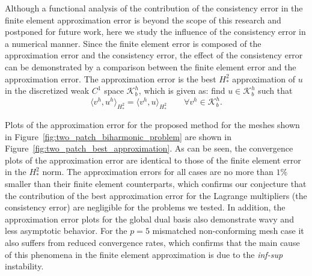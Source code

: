 Although a functional analysis of the contribution of the consistency error in the finite element approximation error is beyond the scope of this research and postponed for future work, here we study the influence of the consistency error in a numerical manner. Since the finite element error is composed of the approximation error and the consistency error, the effect of the consistency error can be demonstrated by a comparison between the finite element error and the approximation error. The approximation error is the best $H^2_*$ approximation of $u$ in the discretized weak $C^1$ space $\mathcal{K}_b^h$, which is given as: find $u\in\mathcal{K}_b^h$ such that
\begin{equation}
	\langle{v^h,u^h}\rangle_{H^2_*}= \langle{v^h,u}\rangle_{H^2_*}\quad\quad\forall{v^h\in\mathcal{K}_b^h}.
\end{equation}

Plots of the approximation error for the proposed method for the meshes shown in Figure~\ref{fig:two_patch_biharmonic_problem} are shown in Figure~\ref{fig:two_patch_best_approximation}. As can be seen, the convergence plots of the approximation error are identical to those of the finite element error in the $H^2_*$ norm. The approximation errors for all cases are no more than $1\%$ smaller than their finite element counterparts, which confirms our conjecture that the contribution of the best approximation error for the Lagrange multipliers (the consistency error) are negligible for the problems we tested. In addition, the approximation error plots for the global dual basis also demonstrate wavy and less asymptotic behavior. For the $p=5$ mismatched non-conforming mesh case it also suffers from reduced convergence rates, which confirms that the main cause of this phenomena in the finite element approximation is due to the \textit{inf-sup} instability.\par


